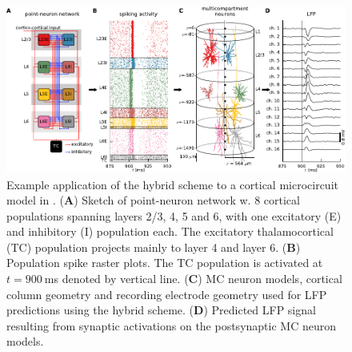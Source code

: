 \begin{figure}[htbp]
\begin{center}
\includegraphics[width=\columnwidth]{Figures/Ch-LFPy/hybridmodel}
\caption{Example application of the hybrid scheme to a cortical microcircuit model in \protect{}. 
({\bf A}) Sketch of point-neuron network w. 8 cortical  populations spanning layers 2/3, 4, 5 and 6, with one excitatory (E) and inhibitory (I) population each. 
The excitatory thalamocortical (TC) population projects mainly to layer 4 and layer 6. 
({\bf B}) Population spike raster plots. The TC population is activated at $t=900~$\si{ms} denoted by vertical line.
({\bf C}) MC neuron models, cortical column geometry and recording electrode geometry used for LFP predictions using the hybrid scheme.
({\bf D}) Predicted LFP signal resulting from synaptic activations on the postsynaptic MC neuron models.
}
\label{fig:LFPy:hybridmodel}
\end{center}
\end{figure}
